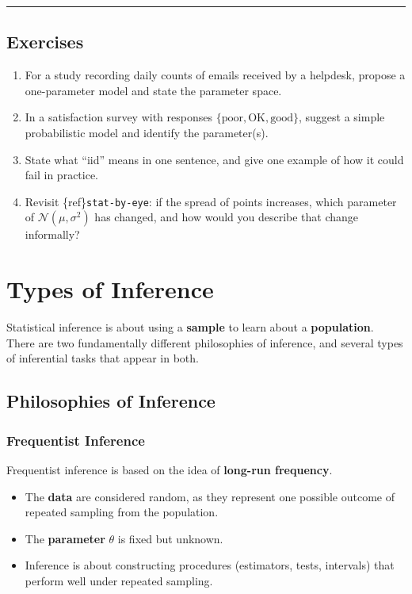 \documentclass[
  letterpaper,
  DIV=11,
  numbers=noendperiod]{scrreprt}
\providecommand{\tightlist}{%
  \setlength{\itemsep}{0pt}\setlength{\parskip}{0pt}}
\theoremstyle{definition}
\theoremstyle{plain}
\theoremstyle{definition}
\theoremstyle{remark}
\begin{document}
\begin{center}\rule{0.5\linewidth}{0.5pt}\end{center}

\section{Exercises}\label{exercises}

\begin{enumerate}
\def\labelenumi{\arabic{enumi}.}
\tightlist
\item
  For a study recording daily counts of emails received by a helpdesk,
  propose a one-parameter model and state the parameter space.
\item
  In a satisfaction survey with responses
  \(\{\text{poor},\text{OK},\text{good}\}\), suggest a simple
  probabilistic model and identify the parameter(s).
\item
  State what ``iid'' means in one sentence, and give one example of how
  it could fail in practice.
\item
  Revisit \{ref\}\texttt{stat-by-eye}: if the spread of points
  increases, which parameter of \(\mathcal{N}(\mu,\sigma^2)\) has
  changed, and how would you describe that change informally?
\end{enumerate}

\chapter{Types of Inference}\label{sec-types-of-inference}

Statistical inference is about using a \textbf{sample} to learn about a
\textbf{population}. There are two fundamentally different philosophies
of inference, and several types of inferential tasks that appear in
both.

\section{Philosophies of Inference}\label{philosophies-of-inference}

\subsection{Frequentist Inference}\label{frequentist-inference}

Frequentist inference is based on the idea of \textbf{long-run
frequency}.

\begin{itemize}
\tightlist
\item
  The \textbf{data} are considered random, as they represent one
  possible outcome of repeated sampling from the population.
\item
  The \textbf{parameter} \(\theta\) is fixed but unknown.
\item
  Inference is about constructing procedures (estimators, tests,
  intervals) that perform well under repeated sampling.
\end{itemize}
\end{document}
